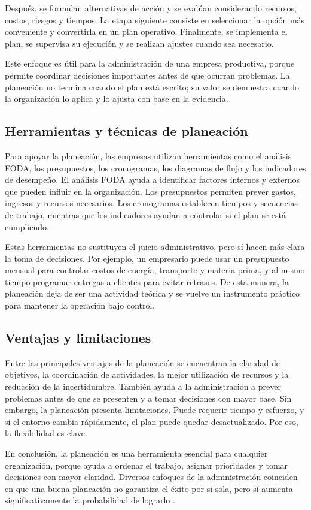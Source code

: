 Después, se formulan alternativas de acción y se evalúan considerando recursos, costos, riesgos y tiempos. La etapa siguiente consiste en seleccionar la opción más conveniente y convertirla en un plan operativo. Finalmente, se implementa el plan, se supervisa su ejecución y se realizan ajustes cuando sea necesario.

Este enfoque es útil para la administración de una empresa productiva, porque permite coordinar decisiones importantes antes de que ocurran problemas. La planeación no termina cuando el plan está escrito; su valor se demuestra cuando la organización lo aplica y lo ajusta con base en la evidencia.

\subsection{Herramientas y técnicas de planeación}
Para apoyar la planeación, las empresas utilizan herramientas como el análisis FODA, los presupuestos, los cronogramas, los diagramas de flujo y los indicadores de desempeño. El análisis FODA ayuda a identificar factores internos y externos que pueden influir en la organización. Los presupuestos permiten prever gastos, ingresos y recursos necesarios. Los cronogramas establecen tiempos y secuencias de trabajo, mientras que los indicadores ayudan a controlar si el plan se está cumpliendo.

Estas herramientas no sustituyen el juicio administrativo, pero sí hacen más clara la toma de decisiones. Por ejemplo, un empresario puede usar un presupuesto mensual para controlar costos de energía, transporte y materia prima, y al mismo tiempo programar entregas a clientes para evitar retrasos. De esta manera, la planeación deja de ser una actividad teórica y se vuelve un instrumento práctico para mantener la operación bajo control.

\subsection{Ventajas y limitaciones}
Entre las principales ventajas de la planeación se encuentran la claridad de objetivos, la coordinación de actividades, la mejor utilización de recursos y la reducción de la incertidumbre. También ayuda a la administración a prever problemas antes de que se presenten y a tomar decisiones con mayor base. Sin embargo, la planeación presenta limitaciones. Puede requerir tiempo y esfuerzo, y si el entorno cambia rápidamente, el plan puede quedar desactualizado. Por eso, la flexibilidad es clave.

En conclusión, la planeación es una herramienta esencial para cualquier organización, porque ayuda a ordenar el trabajo, asignar prioridades y tomar decisiones con mayor claridad. Diversos enfoques de la administración coinciden en que una buena planeación no garantiza el éxito por sí sola, pero sí aumenta significativamente la probabilidad de lograrlo \parencite{robbins2017,bateman2020}.